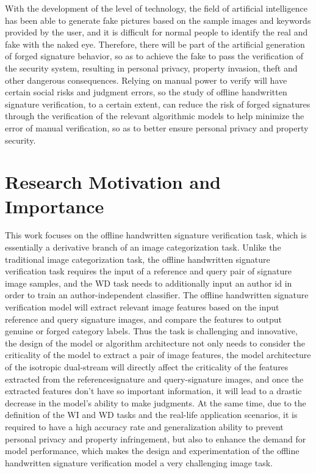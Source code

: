 With the development of the level of technology, the field of artificial intelligence has been able to generate fake pictures based on the sample images and keywords provided by the user, and it is difficult for normal people to identify the real and fake with the naked eye. Therefore, there will be part of the artificial generation of forged signature behavior, so as to achieve the fake to pass the verification of the security system, resulting in personal privacy, property invasion, theft and other dangerous consequences. Relying on manual power to verify will have certain social risks and judgment errors, so the study of offline handwritten signature verification, to a certain extent, can reduce the risk of forged signatures through the verification of the relevant algorithmic models to help minimize the error of manual verification, so as to better ensure personal privacy and property security.

\section{Research Motivation and Importance}

This work focuses on the offline handwritten signature verification task, which is essentially a derivative branch of an image categorization task. Unlike the traditional image categorization task, the offline handwritten signature verification task requires the input of a reference and query pair of signature image samples, and the WD task needs to additionally input an author id in order to train an author-independent classifier. The offline handwritten signature verification model will extract relevant image features based on the input reference and query signature images, and compare the features to output genuine or forged category labels. Thus the task is challenging and innovative, the design of the model or algorithm architecture not only needs to consider the criticality of the model to extract a pair of image features, the model architecture of the isotropic dual-stream will directly affect the criticality of the features extracted from the referencesignature and query-signature images, and once the extracted features don't have so important information, it will lead to a drastic decrease in the model's ability to make judgments. At the same time, due to the definition of the WI and WD tasks and the real-life application scenarios, it is required to have a high accuracy rate and generalization ability to prevent personal privacy and property infringement, but also to enhance the demand for model performance, which makes the design and experimentation of the offline handwritten signature verification model a very challenging image task.

